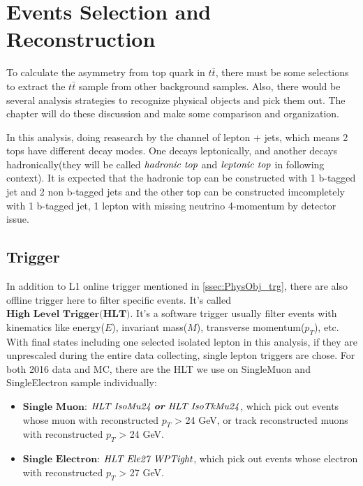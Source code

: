 

\section{Events Selection and Reconstruction}
\label{sec:EventSelReco}

	To calculate the asymmetry from top quark in $t\bar{t}$, there must be some selections to extract the $t\bar{t}$ sample from other background samples. Also, there would be several analysis strategies to recognize physical objects and pick them out. The chapter will do these discussion and make some comparison and organization.

	In this analysis, doing reasearch by the channel of lepton + jets, which means 2 tops have different decay modes. One decays leptonically, and another decays hadronically(they will be called $\emph{hadronic top}$ and $\emph{leptonic top}$ in following context). It is expected that the hadronic top can be constructed with 1 b-tagged jet and 2 non b-tagged jets and the other top can be constructed imcompletely with 1 b-tagged jet, 1 lepton with missing neutrino 4-momentum by detector issue. 
	
	\subsection{Trigger}
	\label{ssec:EvtSel_trg}

		In addition to L1 online trigger mentioned in \ref{ssec:PhysObj_trg}, there are also offline trigger here to filter specific events. It's called $\textbf{High Level Trigger(HLT)}$. It's a software trigger usually filter events with kinematics like energy($E$), invariant mass($M$), transverse momentum($p_{T}$), etc. With final states including one selected isolated lepton in this analysis, if they are unprescaled during the entire data collecting, single lepton triggers are chose. For both 2016 data and MC, there are the HLT we use on SingleMuon and SingleElectron sample individually:

		\begin{itemize}
	  		\item $\textbf{Single Muon}$: $\emph{HLT IsoMu24 \textbf{or} HLT IsoTkMu24}$, which pick out events whose muon with reconstructed $p_{T}$ > 24 GeV, or track reconstructed muons with reconstructed $p_{T}$ > 24 GeV.
	  		\item $\textbf{Single Electron}$: $\emph{HLT Ele27 WPTight}$, which pick out events whose electron with reconstructed $p_{T}$ > 27 GeV.
	  	\label{EventSelReco:itm:HLT}
		\end{itemize}

